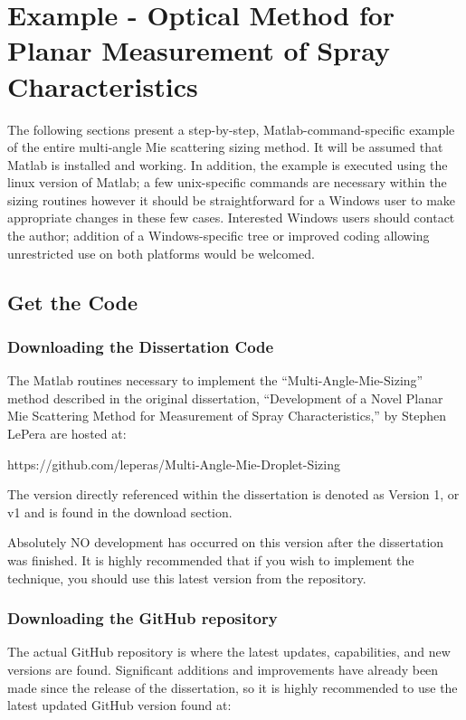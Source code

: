 \chapter{Example - Optical Method for Planar Measurement of Spray Characteristics}
\label{step_by_step_example}

The following sections present a step-by-step, Matlab-command-specific example of the entire multi-angle Mie scattering sizing method.  It will be assumed that Matlab is installed and working.  In addition, the example is executed using the linux version of Matlab; a few unix-specific commands are necessary within the sizing routines however it should be straightforward for a Windows user to make appropriate changes in these few cases.  Interested Windows users should contact the author; addition of a Windows-specific tree or improved coding allowing unrestricted use on both platforms would be welcomed.

\section{Get the Code}
\subsection{Downloading the Dissertation Code}
The Matlab routines necessary to implement the ``Multi-Angle-Mie-Sizing'' method described in the original dissertation, ``Development of a Novel Planar Mie Scattering Method for Measurement of Spray Characteristics,'' by Stephen LePera are hosted at:

https://github.com/leperas/Multi-Angle-Mie-Droplet-Sizing

The version directly referenced within the dissertation is denoted as Version 1, or v1 and is found in the download section.

Absolutely NO development has occurred on this version after the dissertation was finished.  It is highly recommended that if you wish to implement the technique, you should use this latest version from the repository.

\subsection{Downloading the GitHub repository}

The actual GitHub repository is where the latest updates, capabilities, and new versions are found.  Significant additions and improvements have already been made since the release of the dissertation, so it is highly recommended to use the latest updated GitHub version found at:

